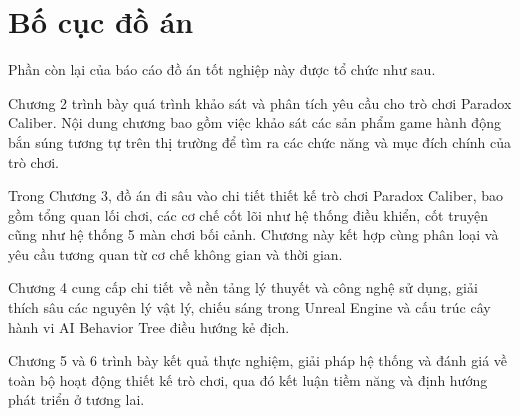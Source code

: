 \documentclass[../DoAn.tex]{subfiles}
\begin{document}
\section{Bố cục đồ án}
\label{section:1.4}
Phần còn lại của báo cáo đồ án tốt nghiệp này được tổ chức như sau.

Chương 2 trình bày quá trình khảo sát và phân tích yêu cầu cho trò chơi Paradox Caliber. Nội dung chương bao gồm việc khảo sát các sản phẩm game hành động bắn súng tương tự trên thị trường để tìm ra các chức năng và mục đích chính của trò chơi.

Trong Chương 3, đồ án đi sâu vào chi tiết thiết kế trò chơi Paradox Caliber, bao gồm tổng quan lối chơi, các cơ chế cốt lõi như hệ thống điều khiển, cốt truyện cũng như hệ thống 5 màn chơi bối cảnh. Chương này kết hợp cùng phân loại và yêu cầu tương quan từ cơ chế không gian và thời gian.

Chương 4 cung cấp chi tiết về nền tảng lý thuyết và công nghệ sử dụng, giải thích sâu các nguyên lý vật lý, chiếu sáng trong Unreal Engine và cấu trúc cây hành vi AI Behavior Tree điều hướng kẻ địch.

Chương 5 và 6 trình bày kết quả thực nghiệm, giải pháp hệ thống và đánh giá về toàn bộ hoạt động thiết kế trò chơi, qua đó kết luận tiềm năng và định hướng phát triển ở tương lai.
\end{document}
